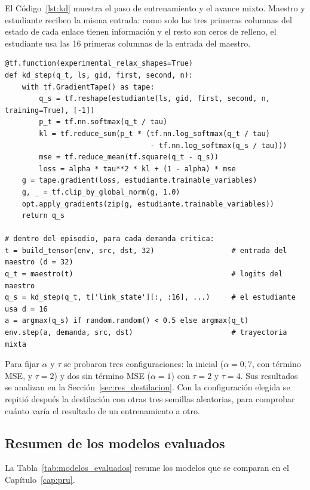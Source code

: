 El Código~\ref{lst:kd} muestra el paso de entrenamiento y el avance mixto. Maestro y estudiante reciben la misma entrada: como solo las tres primeras columnas del estado de cada enlace tienen información y el resto son ceros de relleno, el estudiante usa las 16 primeras columnas de la entrada del maestro.

\begin{lstlisting}[style=Python, caption={[Paso de destilación y avance mixto]Paso de destilación y avance mixto del entorno (\texttt{distill\_student\_v2.py}, simplificado).}, label=lst:kd]
@tf.function(experimental_relax_shapes=True)
def kd_step(q_t, ls, gid, first, second, n):
    with tf.GradientTape() as tape:
        q_s = tf.reshape(estudiante(ls, gid, first, second, n, training=True), [-1])
        p_t = tf.nn.softmax(q_t / tau)
        kl = tf.reduce_sum(p_t * (tf.nn.log_softmax(q_t / tau)
                                  - tf.nn.log_softmax(q_s / tau)))
        mse = tf.reduce_mean(tf.square(q_t - q_s))
        loss = alpha * tau**2 * kl + (1 - alpha) * mse
    g = tape.gradient(loss, estudiante.trainable_variables)
    g, _ = tf.clip_by_global_norm(g, 1.0)
    opt.apply_gradients(zip(g, estudiante.trainable_variables))
    return q_s

# dentro del episodio, para cada demanda critica:
t = build_tensor(env, src, dst, 32)                  # entrada del maestro (d = 32)
q_t = maestro(t)                                     # logits del maestro
q_s = kd_step(q_t, t['link_state'][:, :16], ...)     # el estudiante usa d = 16
a = argmax(q_s) if random.random() < 0.5 else argmax(q_t)
env.step(a, demanda, src, dst)                       # trayectoria mixta
\end{lstlisting}

Para fijar $\alpha$ y $\tau$ se probaron tres configuraciones: la inicial ($\alpha = 0{,}7$, con término MSE, y $\tau = 2$) y dos sin término MSE ($\alpha = 1$) con $\tau = 2$ y $\tau = 4$. Sus resultados se analizan en la Sección~\ref{sec:res_destilacion}. Con la configuración elegida se repitió después la destilación con otras tres semillas aleatorias, para comprobar cuánto varía el resultado de un entrenamiento a otro.

\subsection{Resumen de los modelos evaluados}

La Tabla~\ref{tab:modelos_evaluados} resume los modelos que se comparan en el Capítulo~\ref{cap:pru}.

